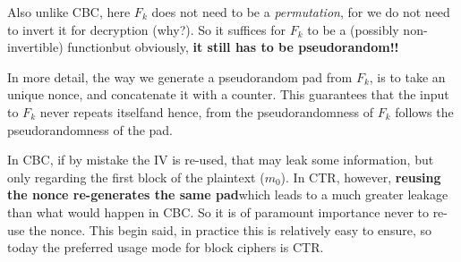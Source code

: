   \noindent Also unlike CBC, here $F_k$ does not need to be a \emph{permutation}, for we do not need to invert it for decryption (why?). So it suffices for $F_k$ to be a (possibly non-invertible) function\emd but obviously, \textbf{it still has to be pseudorandom!!}

  In more detail, the way we generate a pseudorandom pad from $F_k$, is to take an unique nonce, and concatenate it with a counter. This guarantees that the input to $F_k$ never repeats itself\emd and hence, from the pseudorandomness of $F_k$ follows the pseudorandomness of the pad.

  \medskip

   In CBC, if by mistake the IV is re-used, that may leak some information, but only regarding the first block of the plaintext ($m_0$). In CTR, however, \textbf{reusing the nonce re-generates the same pad}\emd which leads to a much greater leakage than what would happen in CBC. So it is of paramount importance never to re-use the nonce. This begin said, in practice this is relatively easy to ensure, so today the preferred usage mode for block ciphers is CTR.

